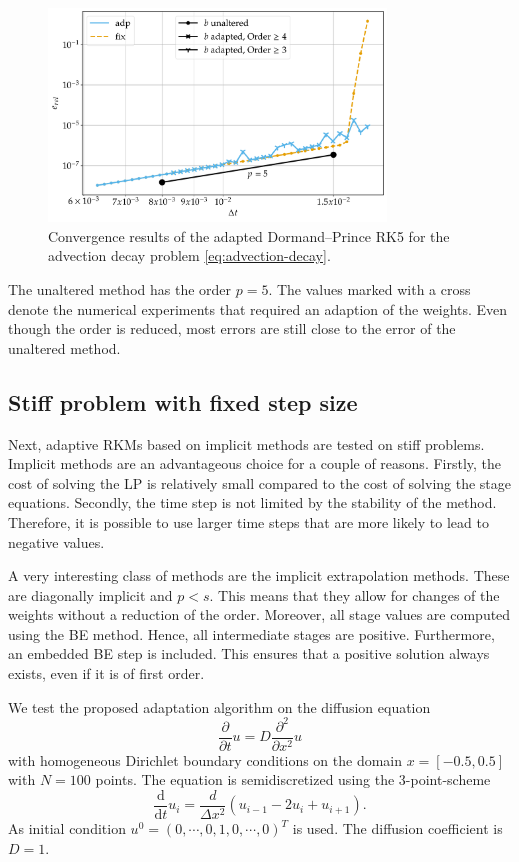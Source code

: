 \documentclass[a4paper]{article}
\numberwithin{equation}{section}
\theoremstyle{plain}
\theoremstyle{definition}
\numberwithin{theorem}{section}
\newcommand{\1}{\mathbbm{1}}
\begin{document}
\begin{figure}[ht]
\centering
\includegraphics[width=0.8\textwidth]{plots/conv_adde.pdf}
\caption{Convergence results of the adapted Dormand--Prince RK5 for the advection decay problem \eqref{eq:advection-decay}.}
\label{fig:conv_expl}
\end{figure}

The unaltered method has the order $p=5$.
The values marked with a cross denote the numerical experiments that required an adaption of the weights.
Even though the order is reduced, most errors are still close to the error of the unaltered method.

\subsection{Stiff problem with fixed step size}
Next, adaptive RKMs based on implicit methods are tested on stiff problems.
Implicit methods are an advantageous choice for a couple of reasons.
Firstly, the cost of solving the LP is relatively small compared to the cost of solving the stage equations.
Secondly, the time step is not limited by the stability of the method.
Therefore, it is possible to use larger time steps that are more likely to lead to negative values.

A very interesting class of methods are the implicit extrapolation methods. These are diagonally implicit and $p < s$. This means that they allow for changes of the weights without a reduction of the order.
Moreover, all stage values are computed using the BE method. Hence, all intermediate stages are positive.
Furthermore, an embedded BE step is included. This ensures that a positive solution always exists, even if it is of first order.

We test the proposed adaptation algorithm on the diffusion equation
\begin{equation}
\label{eq:diffusion}
\frac{\partial }{\partial t} u = D \frac{\partial^2}{\partial x^2} u
\end{equation}
with homogeneous Dirichlet boundary conditions on the domain $x = [-0.5,0.5]$ with $N=100$ points. The equation is semidiscretized using the 3-point-scheme
\begin{equation}
\frac{\mathrm d}{\mathrm d t} u_i = \frac{d}{\Delta x^2} \left( u_{i-1} - 2u_i + u_{i+1} \right).
\end{equation}
As initial condition $u^0 = (0,\cdots,0,1,0,\cdots,0)^T$ is used. The diffusion coefficient is $D=1$.
\end{document}
